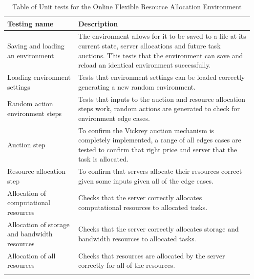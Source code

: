 \begin{longtable}{|p{3cm}|p{11cm}|} \hline
    \textbf{Testing name} & \textbf{Description} \\ \hline
    Saving and loading an environment & The environment allows for it to be saved to a file at its current state,
        server allocations and future task auctions. This tests that the environment can save and reload an
        identical environment successfully. \\ \hline
    Loading environment settings & Tests that environment settings can be loaded correctly generating a new random
        environment. \\ \hline
    Random action environment steps & Tests that inputs to the auction and resource allocation steps work,
        random actions are generated to check for environment edge cases.  \\ \hline
    Auction step & To confirm the Vickrey auction mechanism is completely implemented, a range of all edges cases
        are tested to confirm that right price and server that the task is allocated. \\ \hline
    Resource allocation step & To confirm that servers allocate their resources correct given some inputs given all of
        the edge cases. \\ \hline
    Allocation of computational resources & Checks that the server correctly allocates computational resources to
        allocated tasks. \\ \hline
    Allocation of storage and bandwidth resources & Checks that the server correctly allocates storage and
        bandwidth resources to allocated tasks. \\ \hline
    Allocation of all resources & Checks that resources are allocated by the server correctly for all of the
        resources. \\ \hline
    \caption{Table of Unit tests for the Online Flexible Resource Allocation Environment}
    \label{tab:env_testing}
\end{longtable}

